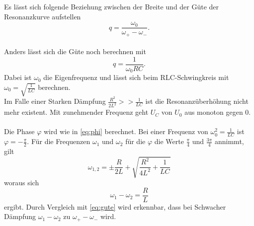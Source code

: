 Es lässt sich folgende Beziehung zwischen der Breite und der Güte der Resonanzkurve aufstellen
\begin{equation*}
    q = \frac{ω_0}{ω_+ - ω_-}.
\end{equation*}\\
Anders lässt sich die Güte noch berechnen mit
\begin{equation}\label{eq:lol}
    q = \frac{1}{\omega_0 R C}.
\end{equation}
Dabei ist $\omega_0$ die Eigenfrequenz und lässt sich beim RLC-Schwingkreis mit $\omega_0 = \sqrt{\frac{1}{LC}}$ berechnen.
\\
Im Falle einer Starken Dämpfung $\frac{R^2}{2L^2} >> \frac{1}{LC}$ ist die Resonanzüberhöhung nicht mehr existent.
Mit zunehmender Frequenz geht $U_C$ von $U_0$ aus monoton gegen $0.$\\
\\
Die Phase $φ$ wird wie in \eqref{eq:phi} berechnet. Bei einer Frequenz von $ω_0^2 = \frac{1}{LC}$ ist $φ = -\frac{\pi}{2}.$
Für die Frequenzen $ω_1$ und $ω_2$ für die $φ$ die Werte $\frac{\pi}{4}$ und $\frac{3\pi}{4}$ annimmt, gilt
\begin{equation}\label{eq:w12}
    ω_{1,2} = \pm \frac{R}{2L} + \sqrt{\frac{R^2}{4L^2} + \frac{1}{LC}}
\end{equation}
woraus sich
\begin{equation*}
    ω_1 - ω_2 = \frac{R}{L}
\end{equation*}
ergibt. Durch Vergleich mit \eqref{eq:gute} wird erkennbar, dass bei Schwacher Dämpfung $ω_1 - ω_2$ zu $ω_+ - ω_-$ wird.
\newpage
